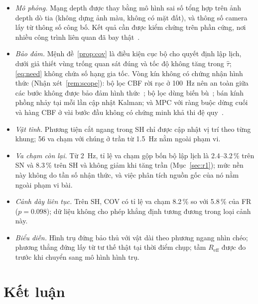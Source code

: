 \documentclass[11pt,a4paper]{article}
\theoremstyle{plain}
\theoremstyle{definition}
\theoremstyle{remark}
\newcommand{\tauh}{\hat{\tau}}
\newcommand{\Reff}{R_{\mathrm{eff}}}
\begin{document}
\begin{itemize}
\item \emph{Mô phỏng.} Mạng depth được thay bằng mô hình sai số tổng hợp trên ảnh depth dò tia (không dựng ảnh màu, không có mặt đất), và thông số camera lấy từ thông số công bố. Kết quả cần được kiểm chứng trên phần cứng, nơi nhiều công trình liên quan đã bay thật~\cite{loquercio2021,simon2023,tordesillas2021,pant2021}.
\item \emph{Bảo đảm.} Mệnh đề~\ref{prop:cov} là điều kiện cục bộ cho quyết định lập lịch, dưới giả thiết vùng trống quan sát đúng và tốc độ không tăng trong $\tauh$; \eqref{eq:need} không chứa số hạng gia tốc. Vòng kín không có chứng nhận hình thức (Nhận xét~\ref{rem:scope}): bộ lọc CBF rời rạc ở 100~Hz nên an toàn giữa các bước không được bảo đảm hình thức~\cite{breeden2022,bahati2024}; bộ lọc dùng biến bù~\cite{yaghoubi2021}; bán kính phồng nhảy tại mỗi lần cập nhật Kalman; và MPC với ràng buộc dừng cuối và hàng CBF ở vài bước đầu không có chứng minh khả thi đệ quy~\cite{zeng2021}.
\item \emph{Vật tĩnh.} Phương tiện cắt ngang trong SH chỉ được cập nhật vị trí theo từng khung; 56 va chạm với chúng ở trần từ 1.5~Hz nằm ngoài phạm vi.
\item \emph{Va chạm còn lại.} Từ 2~Hz, tỉ lệ va chạm gộp bốn bộ lập lịch là 2.4--3.2\,\% trên SN và 8.3\,\% trên SH và không giảm khi tăng trần (Mục~\ref{sec:r1}); mức nền này không do tần số nhận thức, và việc phân tích nguồn gốc của nó nằm ngoài phạm vi bài.
\item \emph{Cảnh dày liên tục.} Trên SH, COV có tỉ lệ va chạm 8.2\,\% so với 5.8\,\% của FR ($p = 0.098$); dữ liệu không cho phép khẳng định tương đương trong loại cảnh này.
\item \emph{Biểu diễn.} Hình trụ đứng bảo thủ với vật dài theo phương ngang nhìn chéo; phương thẳng đứng lấy từ tư thế thật tại thời điểm chụp; tầm $\Reff$ được đo trước khi chuyển sang mô hình hình trụ.
\end{itemize}

\section{Kết luận}\label{sec:conclusion}
\end{document}
